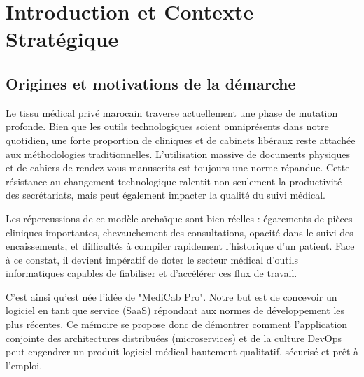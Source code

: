 \documentclass[final]{report}
\begin{document}
\chapter{Introduction et Contexte Stratégique}
 
\section{Origines et motivations de la démarche}
Le tissu médical privé marocain traverse actuellement une phase de mutation profonde. Bien que les outils technologiques soient omniprésents dans notre quotidien, une forte proportion de cliniques et de cabinets libéraux reste attachée aux méthodologies traditionnelles. L'utilisation massive de documents physiques et de cahiers de rendez-vous manuscrits est toujours une norme répandue. Cette résistance au changement technologique ralentit non seulement la productivité des secrétariats, mais peut également impacter la qualité du suivi médical.
 
Les répercussions de ce modèle archaïque sont bien réelles : égarements de pièces cliniques importantes, chevauchement des consultations, opacité dans le suivi des encaissements, et difficultés à compiler rapidement l'historique d'un patient. Face à ce constat, il devient impératif de doter le secteur médical d'outils informatiques capables de fiabiliser et d'accélérer ces flux de travail.
 
C'est ainsi qu'est née l'idée de "MediCab Pro". Notre but est de concevoir un logiciel en tant que service (SaaS) répondant aux normes de développement les plus récentes. Ce mémoire se propose donc de démontrer comment l'application conjointe des architectures distribuées (microservices) et de la culture DevOps peut engendrer un produit logiciel médical hautement qualitatif, sécurisé et prêt à l'emploi.
 
\end{document}
